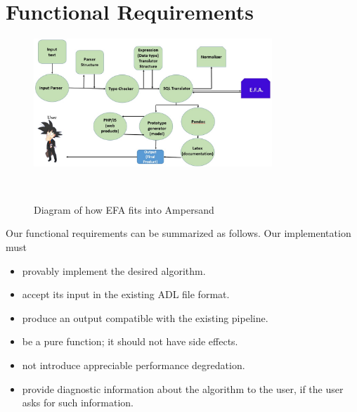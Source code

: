 \documentclass[12pt]{report}
\begin{document}
\section{Functional Requirements}\label{sec:Functional}
\begin{figure}[!htb]
	\centering
	\includegraphics[width=0.8\textwidth]{../figures/functional}
	\caption{Diagram of how EFA fits into Ampersand}~\label{fig:figure2}
\end{figure}
Our functional requirements can be summarized as follows. Our implementation must
\begin{itemize}
\item provably implement the desired algorithm.
\item accept its input in the existing ADL file format.
\item produce an output compatible with the existing pipeline. 
\item be a pure function; it should not have side effects.  
\item not introduce appreciable performance degredation. 
\item provide diagnostic information about the algorithm to
the user, if the user asks for such information.
\end{itemize}
\end{document}
